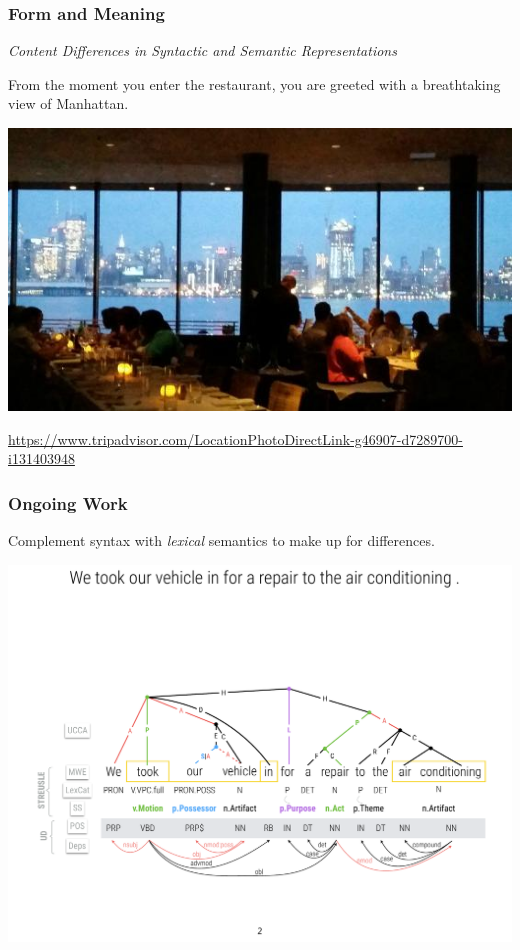 \documentclass[t,xcolor={svgnames,table}]{beamer}
\begin{document}
\begin{frame}
\frametitle{Form and Meaning}
\textit{Content Differences in Syntactic and Semantic Representations} \citep*{hershcovich2019content}

\begin{adjustbox}{frame,center,minipage=[r][0.1\textheight][b]{.7\textwidth}}
From the moment you enter the restaurant, you are greeted with a breathtaking view of Manhattan.
\end{adjustbox}

\begin{center}
\includegraphics[width=.7\textwidth]{chart-house.jpg}
\end{center}

\begin{flushright}
\tiny\url{https://www.tripadvisor.com/LocationPhotoDirectLink-g46907-d7289700-i131403948}
\end{flushright}
\end{frame}


\begin{frame}
\frametitle{Ongoing Work}

Complement syntax with \textit{lexical} semantics to make up for differences.

\includegraphics[width=\textwidth]{ex-ucca-streusle.pdf}

\end{frame}
\end{document}
